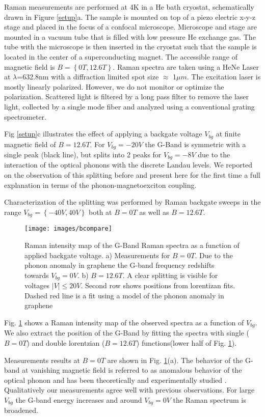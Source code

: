 \documentclass[prl,aps,superscriptaddress,showpacs,reprint]{revtex4-1}
\begin{document}
Raman measurements are performed at 4K in a He bath cryostat, schematically drawn in Figure \ref{setup}a. The sample is mounted on top of a piezo electric x-y-z stage and placed in the focus of a confocal microscope. Microscope and stage are mounted in a vacuum tube that is filled with low pressure He exchange gas. The tube with the microscope is then inserted in the cryostat such that the sample is located in the center of a superconducting magnet. The accessible range of magnetic field is $B=\left\lbrace 0T,12.6T \right\rbrace$.
Raman spectra are taken using a HeNe Laser at $\lambda$=632.8nm with a diffraction limited spot size $\approx$ 1$\mu m$. The excitation laser is mostly linearly polarized. However, we do not monitor or optimize the polarization. Scattered light is filtered by a long pass filter to remove the laser light, collected by a single mode fiber and analyzed using a conventional grating spectrometer.

Fig \ref{setup}c illustrates the effect of applying a backgate voltage $V_{bg}$ at finite magnetic field of $B=12.6T$. For $V_{bg}=-20V$ the G-Band is symmetric with a single peak (black line), but splits into 2 peaks for $V_{bg}=-8V$ due to the interaction of the optical phonons with the discrete Landau levels. We reported on the observation of this splitting before \cite{kias2009} and present here for the first time a full explanation in terms of the phonon-magnetoexciton coupling.

Characterization of the splitting was performed by Raman backgate sweeps in the range $V_{bg}=\left\lbrace -40V,40V \right\rbrace$ both at $B=0T$ as well as $B=12.6T$.
\begin{figure}[!hb]
   \texttt{[image: images/bcompare]}
   \caption{\label{bcompare}Raman intensity map of the G-Band Raman spectra as a function of applied backgate voltage. a) Measurements for $B=0T$. Due to the phonon anomaly in graphene the G-band frequency redshifts towards $V_{bg}=0V$. b) $B=12.6T$. A clear splitting is visible for voltages $\left|V\right|\leq 20V$. Second row shows positions from lorentizan fits. Dashed red line is a fit using a model of the phonon anomaly in graphene}
\end{figure}
Fig. \ref{bcompare} shows a Raman intensity map of the observed spectra as a function of $V_{bg}$. We also extract the position of the G-Band by fitting the spectra with single ($B=0T$) and double lorentzian ($B=12.6T$) functions(lower half of Fig. \ref{bcompare}).

Measurements results at $B=0T$ are shown in Fig. \ref{bcompare}(a).
The behavior of the G-band at vanishing magnetic field is referred to as anomalous behavior of the optical phonon and has been theoretically and experimentally studied \cite{pisana2007breakdown,yan2007electric,stampfer2007raman,tsuneya2006anomaly}. Qualitatively our measurements agree well with previous observations. For large $V_{bg}$ the G-band energy increases and around $V_{bg}=0V$ the Raman spectrum is broadened. 
\end{document}

